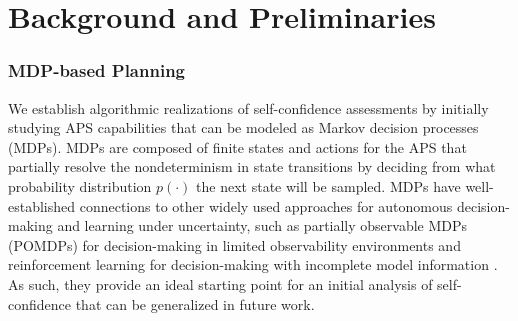 \section{Background and Preliminaries} \label{sec:background}

\subsubsection{MDP-based Planning} \label{sec:mdp}
We establish algorithmic realizations of self-confidence assessments by initially studying APS capabilities that can be modeled as Markov decision processes (MDPs). MDPs are composed of finite states and actions for the APS that partially resolve the nondeterminism in state transitions by deciding from what probability distribution $p(\cdot)$ the next state will be sampled. %
MDPs have well-established connections to other widely used approaches for autonomous decision-making and learning under uncertainty, such as partially observable MDPs (POMDPs) for decision-making in limited observability environments and reinforcement learning for decision-making with incomplete model information \cite{Kochenderfer2015-uu}. As such, they provide an ideal starting point for an initial analysis of self-confidence that can be generalized in future work. 

